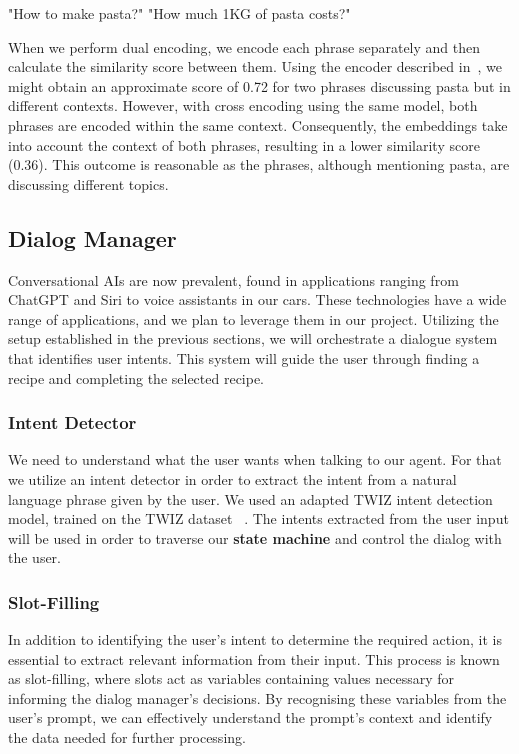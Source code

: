 \documentclass[runningheads]{llncs}
\begin{document}
\hspace{0.5cm} %
\begin{minipage}{1.2\textwidth} %
\begin{dialogue}
 "How to make pasta?"
 "How much 1KG of pasta costs?"\\[5pt]
\end{dialogue}
\end{minipage}

When we perform dual encoding, we encode each phrase separately and then calculate the similarity score between them. Using the encoder described in~\cite{reimers-2019-sentence-bert}, we might obtain an approximate score of 0.72 for two phrases discussing pasta but in different contexts. However, with cross encoding using the same model, both phrases are encoded within the same context. Consequently, the embeddings take into account the context of both phrases, resulting in a lower similarity score (0.36). This outcome is reasonable as the phrases, although mentioning pasta, are discussing different topics.
\subsection{Dialog Manager}
Conversational AIs are now prevalent, found in applications ranging from ChatGPT and Siri to voice assistants in our cars. These technologies have a wide range of applications, and we plan to leverage them in our project. Utilizing the setup established in the previous sections, we will orchestrate a dialogue system that identifies user intents. This system will guide the user through finding a recipe and completing the selected recipe.
\subsubsection{Intent Detector}
We need to understand what the user wants when talking to our agent. For that we utilize an intent detector in order to extract the intent from a natural language phrase given by the user. We used an adapted TWIZ intent detection model, trained on the TWIZ dataset ~\cite{intentdetect}. The intents extracted from the user input will be used in order to traverse our \textbf{state machine} and control the dialog with the user.
\subsubsection{Slot-Filling}
In addition to identifying the user's intent to determine the required action, it is essential to extract relevant information from their input. This process is known as slot-filling, where slots act as variables containing values necessary for informing the dialog manager's decisions. By recognising these variables from the user's prompt, we can effectively understand the prompt's context and identify the data needed for further processing.
\end{document}

